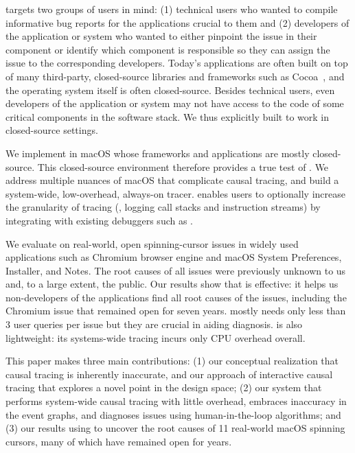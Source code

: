 \xxx targets two groups of users in mind: (1) technical users who wanted
to compile informative bug reports for the applications crucial to them
and (2) developers of the application or system who wanted to either
pinpoint the issue in their component or identify which component is
responsible so they can assign the issue to the corresponding developers.
Today's applications are often built on top of many third-party,
closed-source libraries and frameworks such as Cocoa~\cite{cocoa}, and the
operating system itself is often closed-source.  Besides technical users,
even developers of the application or system may not have access to the
code of some critical components in the software stack.  We thus
explicitly built \xxx to work in closed-source settings.

We implement \xxx in macOS whose frameworks and applications are mostly
closed-source. This closed-source environment therefore provides a true
test of \xxx. We address multiple nuances of macOS that complicate causal
tracing, and build a system-wide, low-overhead, always-on tracer. \xxx
enables users to optionally increase the granularity of tracing (\eg,
logging call stacks and instruction streams) by integrating with existing
debuggers such as .

We evaluate \xxx on \nbug real-world, open spinning-cursor issues in widely
used applications such as Chromium browser engine and macOS System Preferences,
Installer, and Notes. The root causes of all \nbug issues were previously
unknown to us and, to a large extent, the public. Our results show that \xxx is
effective: it helps us non-developers of the applications find all root causes
of the issues, including the Chromium issue that remained open for seven years.
\xxx mostly needs only less than 3 user queries per issue but they are crucial
in aiding diagnosis. \xxx is also lightweight: its systems-wide tracing incurs
only \cpuoverhead CPU overhead overall.


This paper makes three main contributions: (1) our conceptual realization
that causal tracing is inherently inaccurate, and our approach of
interactive causal tracing that explores a novel point in the design
space; (2) our system \xxx that performs system-wide causal tracing with
little overhead, embraces inaccuracy in the event graphs, and diagnoses
issues using human-in-the-loop algorithms; and (3) our results using \xxx
to uncover the root causes of 11 real-world macOS spinning cursors, many
of which have remained open for years.

